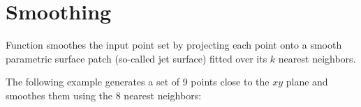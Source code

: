 \section{Smoothing}

Function  smoothes the input point set by projecting each point onto a smooth parametric surface patch (so-called jet surface) fitted over its $k$ nearest neighbors.\\


\ccExample

The following example generates a set of 9 points close to the $xy$ plane and smoothes them using the 8 nearest neighbors:
